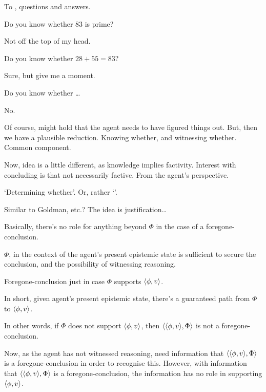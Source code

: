 \begin{note}
  To , questions and answers.

  Do you know whether \(83\) is prime?

  Not off the top of my head.

  Do you know whether \(28 + 55 = 83\)?

  Sure, but give me a moment.

  Do you know whether \dots

  No.

  Of course, might hold that the agent needs to have figured things out.
  But, then we have a plausible reduction.
  Knowing whether, and witnessing whether.
  Common component.

  Now, idea is a little different, as knowledge implies factivity.
  Interest with concluding is that not necessarily factive.
  From the agent's perspective.

  `Determining whether'.
  Or, rather `'.
\end{note}

\begin{note}
  Similar to Goldman, etc.?
  The idea is justification\dots
\end{note}

\begin{note}[Trimming]
  \begin{proposition}
    Basically, there's no role for anything beyond \(\Phi\) in the case of a foregone-conclusion.

    \(\Phi\), in the context of the agent's present epistemic state is sufficient to secure the conclusion, and the possibility of witnessing reasoning.
  \end{proposition}

  \begin{proposition}
    Foregone-conclusion just in case \(\Phi\) supports \(\langle \phi, v \rangle\).
    \begin{argument}
      In short, given agent's present epistemic state, there's a guaranteed path from \(\Phi\) to \(\langle \phi, v \rangle\).
    \end{argument}
    In other words, if \(\Phi\) does not support \(\langle \phi, v \rangle\), then \(\langle \langle \phi, v \rangle, \Phi \rangle\) is not a foregone-conclusion.
  \end{proposition}

  Now, as the agent has not witnessed reasoning, need information that \(\langle \langle \phi, v \rangle, \Phi \rangle\) is a foregone-conclusion in order to recognise this.
  However, with information that \(\langle \langle \phi, v \rangle, \Phi \rangle\) is a foregone-conclusion, the information has no role in supporting \(\langle \phi, v \rangle\).
\end{note}

